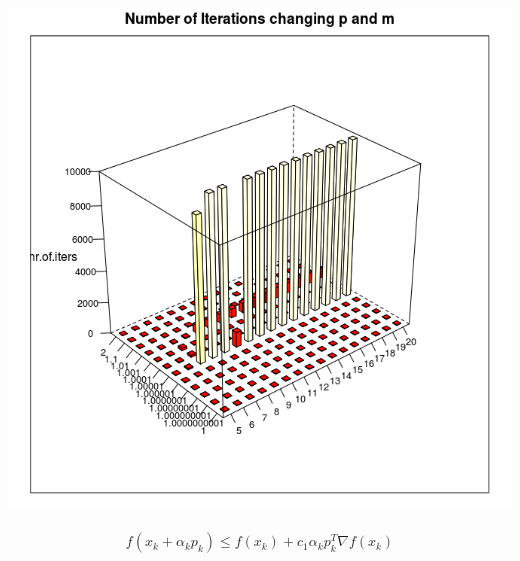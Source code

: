 \begin{center}
\includegraphics[scale=0.3]{Figures/hist3dmpniter.png}
\end{center}

\begin{equation}
  \begin{aligned}
    f(x_k + \alpha_kp_k) \leq f(x_k) + c_1 \alpha _k p_k^T\nabla f(x_k)
  \end{aligned}
\end{equation}

